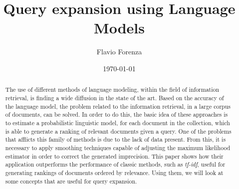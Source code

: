 \documentclass[letterpaper,12pt]{article}
\begin{document}
    
\title{\bfseries{Query expansion using Language Models}}
\author{Flavio Forenza}
\date\today
\maketitle

\begin{abstract}
  The use of different methods of language modeling, within the field 
  of information retrieval, is finding a wide diffusion in the state of the 
  art. Based on the accuracy of the language model, the problem related 
  to the information retrieval, in a large corpus of documents, can be 
  solved. In order to do this, the basic idea of these approaches is to 
  estimate a probabilistic linguistic model, for each document in the 
  collection, which is able to generate a ranking of relevant documents 
  given a query. One of the problems that afflicts this family of methods 
  is due to the lack of data present. From this, it is necessary to apply 
  smoothing techniques capable of adjusting the maximum likelihood 
  estimator in order to correct the generated imprecision. This paper 
  shows how their application outperforms the performance of classic 
  methods, such as \emph{tf-idf}, useful for generating rankings of 
  documents ordered by relevance. Using them, we will look at some concepts that 
  are useful for query expansion.
\end{abstract}







\newpage


\end{document}
